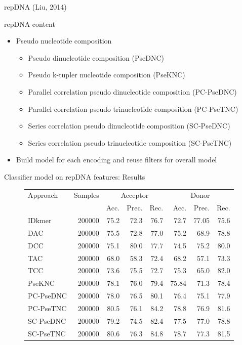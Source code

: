 \documentclass[10pt]{beamer}
\begin{document}
\begin{frame}{repDNA (Liu, 2014)}
	\begin{block}{repDNA content}
		\begin{itemize}
			\item Pseudo nucleotide composition
			\begin{itemize}
				\item Pseudo dinucleotide composition (PseDNC)
				\item Pseudo k-tupler nucleotide composition (PseKNC)
				\item Parallel correlation pseudo dinucleotide composition (PC-PseDNC)
				\item Parallel correlation pseudo trinucleotide composition (PC-PseTNC)
				\item Series correlation pseudo dinucleotide composition (SC-PseDNC)
				\item Series correlation pseudo trinucleotide composition (SC-PseTNC)
			\end{itemize}
		\end{itemize}
	\end{block}
	\pause
	\begin{itemize}
		\item Build model for each encoding and reuse filters for overall model
	\end{itemize}
\end{frame}

\begin{frame}{Classifier model on repDNA features: Results}
	\begin{figure}
		\small
		\centering
		\begingroup
		\def\arraystretch{1.2}
		\begin{tabular}{|l|r|r|r|r|r|r|r|}
			\hline
			Approach  & Samples & \multicolumn{3}{c|}{Acceptor} & \multicolumn{3}{c|}{Donor} \\
			\cline{3-8}
			& & Acc. & Prec. & Rec. & Acc. & Prec. & Rec. \\
			\hline
			IDkmer & 200000 & 75.2 & 72.3 & 76.7 & 72.7 & 77.05 & 75.6 \\
			DAC & 200000 & 75.5 & 72.8 & 77.0 & 75.2 & 68.9 & 78.8 \\
			DCC & 200000 & 75.1 & 80.0 & 77.7 & 74.5 & 75.2 & 80.0 \\
			TAC & 200000 & 68.0 & 58.3 & 72.4 & 68.2 & 57.1 & 73.3 \\
			TCC & 200000 & 73.6 & 75.5 & 72.7 & 75.3 & 65.0 & 82.0 \\
			PseKNC & 200000 & 78.1 & 76.0 & 79.4 & 75.84 & 71.3 & 78.4 \\
			PC-PseDNC & 200000 & 78.0 & 76.5 & 80.1 & 76.4 & 75.1 & 77.9 \\
			PC-PseTNC & 200000 & 80.5 & 76.1 & 84.2 & 78.8 & 76.9 & 81.6 \\
			SC-PseDNC & 200000 & 79.2 & 74.5 & 82.4 & 77.5 & 77.0 & 78.8 \\
			SC-PseTNC & 200000 & 80.6 & 76.3 & 84.8 & 78.7 & 77.3 & 81.5\\
			\hline  
		\end{tabular}
		\endgroup
	\end{figure}
\end{frame}
\end{document}
